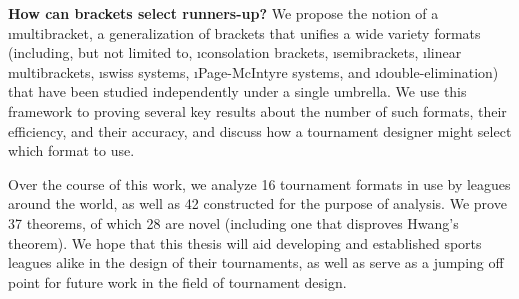 {    {\bf How can brackets select runners-up?} We propose the notion of a \i{multibracket}, a generalization of brackets that unifies a wide variety formats (including, but not limited to, \i{consolation brackets}, \i{semibrackets}, \i{linear multibrackets}, \i{swiss systems}, \i{Page-McIntyre systems}, and \i{double-elimination}) that have been studied independently under a single umbrella. We use this framework to proving several key results about the number of such formats, their efficiency, and their accuracy, and discuss how a tournament designer might select which format to use.

    Over the course of this work, we analyze 16 tournament formats in use by leagues around the world, as well as 42 constructed for the purpose of analysis. We prove 37 theorems, of which 28 are novel (including one that disproves Hwang's theorem). We hope that this thesis will aid developing and established sports leagues alike in the design of their tournaments, as well as serve as a jumping off point for future work in the field of tournament design.





















}
